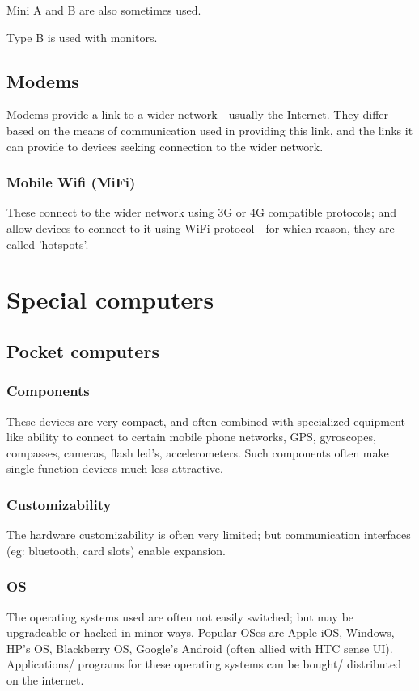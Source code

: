 \documentclass[oneside, article]{memoir}
\begin{document}
Mini A and B are also sometimes used.

Type B is used with monitors.


\section{Modems}
Modems provide a link to a wider network - usually the Internet. They differ based on the means of communication used in providing this link, and the links it can provide to devices seeking connection to the wider network.

\subsection{Mobile Wifi (MiFi)}
These connect to the wider network using 3G or 4G compatible protocols; and allow devices to connect to it using WiFi protocol - for which reason, they are called 'hotspots'.

\chapter{Special computers}
\section{Pocket computers}
\subsection{Components}
These devices are very compact, and often combined with specialized equipment like ability to connect to certain mobile phone networks, GPS, gyroscopes, compasses, cameras, flash led's, accelerometers. Such components often make single function devices much less attractive.

\subsection{Customizability}
The hardware customizability is often very limited; but communication interfaces (eg: bluetooth, card slots) enable expansion.

\subsection{OS}
The operating systems used are often not easily switched; but may be upgradeable or hacked in minor ways. Popular OSes are Apple iOS, Windows, HP's OS, Blackberry OS, Google's Android (often allied with HTC sense UI). Applications/ programs for these operating systems can be bought/ distributed on the internet.
\end{document}
